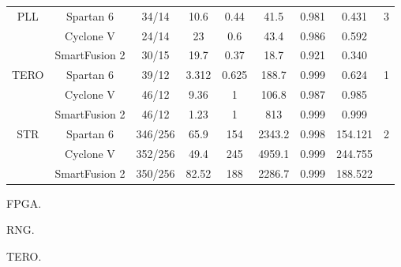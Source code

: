 \begin{table}[htbp]
{\begin{tabular}{|c|c|c|c|c|c|c|c|c|}
    \hline
    \multirow{3}[2]{*}{PLL} & Spartan 6 & 34/14 & 10.6  & 0.44  & 41.5  & 0.981 & 0.431 & \multirow{3}[2]{*}{3} \\
          & Cyclone V & 24/14 & 23    & 0.6   & 43.4  & 0.986 & 0.592 &  \\
          & SmartFusion 2 & 30/15 & 19.7  & 0.37  & 18.7  & 0.921 & 0.340 &  \\
    \hline
    \multirow{3}[2]{*}{TERO} & Spartan 6 & 39/12 & 3.312 & 0.625 & 188.7 & 0.999 & 0.624 & \multirow{3}[2]{*}{1} \\
          & Cyclone V & 46/12 & 9.36  & 1     & 106.8 & 0.987 & 0.985 &  \\
          & SmartFusion 2 & 46/12 & 1.23  & 1     & 813   & 0.999 & 0.999 &  \\
    \hline
    \multirow{3}[2]{*}{STR} & Spartan 6 & 346/256 & 65.9  & 154   & 2343.2 & 0.998 & 154.121 & \multirow{3}[2]{*}{2} \\
          & Cyclone V & 352/256 & 49.4  & 245   & 4959.1 & 0.999 & 244.755 &  \\
          & SmartFusion 2 & 350/256 & 82.52 & 188   & 2286.7 & 0.999 & 188.522 &  \\
    \hline
    \end{tabular}%
}
  \label{tab:addlabel}%

\end{table}%


\gls{FPGA}.

\gls{RNG}.


\gls{TERO}.


	 
	
	
	
